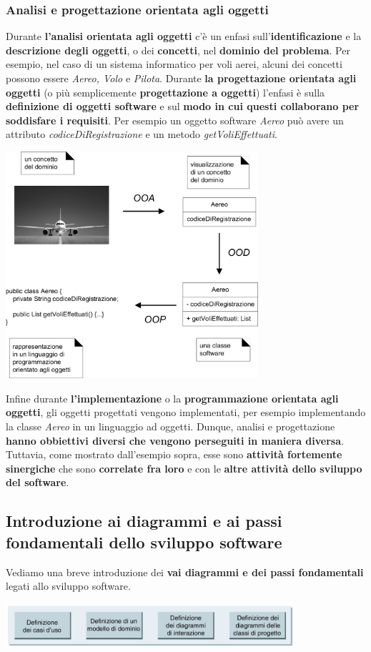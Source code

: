\documentclass[12pt]{article}
\begin{document}
\subsubsection{Analisi e progettazione orientata agli oggetti}
Durante \textbf{l'analisi orientata agli oggetti} c'è un enfasi sull'\textbf{identificazione} e la \textbf{descrizione degli oggetti}, o dei \textbf{concetti}, nel \textbf{dominio del problema}.
Per esempio, nel caso di un sistema informatico per voli aerei, alcuni dei concetti possono essere \textit{Aereo, Volo} e \textit{Pilota}. \newline
Durante \textbf{la progettazione orientata agli oggetti} (o più semplicemente \textbf{progettazione a oggetti}) l'enfasi è sulla \textbf{definizione di oggetti software} e sul \textbf{modo in cui questi collaborano
per soddisfare i requisiti}. Per esempio un oggetto software \textit{Aereo} può avere un attributo \textit{codiceDiRegistrazione} e un metodo \textit{getVoliEffettuati}. \newline
\begin{center}
    \includegraphics[width = 0.70\textwidth]{Images/5.png}
\end{center}
Infine durante \textbf{l'implementazione} o la \textbf{programmazione orientata agli oggetti}, gli oggetti progettati vengono implementati, per esempio implementando la classe \textit{Aereo} in un linguaggio ad oggetti.
Dunque, analisi e progettazione \textbf{hanno obbiettivi diversi che vengono perseguiti in maniera diversa}. Tuttavia, come mostrato dall'esempio sopra, esse sono \textbf{attività fortemente sinergiche} che sono \textbf{correlate fra loro}
e con le \textbf{altre attività dello sviluppo del software}.
\subsection{Introduzione ai diagrammi e ai passi fondamentali dello sviluppo software}
Vediamo una breve introduzione dei \textbf{vai diagrammi e dei passi fondamentali} legati allo sviluppo software.
\begin{center}
    \includegraphics[width = 0.80\textwidth]{Images/6.png}
\end{center}
\end{document}
